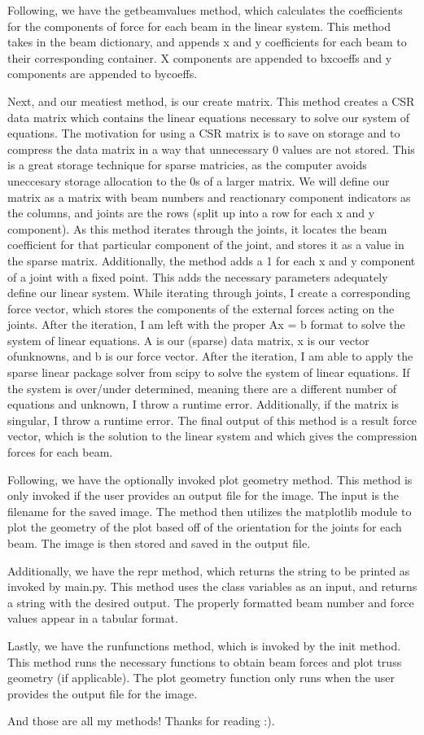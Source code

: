 \documentclass{article}
\begin{document}
Following, we have the getbeamvalues method, which calculates the coefficients
for the components of force for each beam in the linear system. This method 
takes in the beam dictionary, and appends x and y coefficients for each 
beam to their corresponding container. X components are appended to 
bxcoeffs and y components are appended to bycoeffs.

Next, and our meatiest method, is our create matrix. This method creates
a CSR data matrix which contains the linear equations necessary 
to solve our system of equations. The motivation for using a CSR matrix
is to save on storage and to compress the data matrix in a way that 
unnecessary 0 values are not stored. This is a great storage technique 
for sparse matricies, as the computer avoids uneccesary storage 
allocation to the 0s of a larger matrix. We will define our matrix 
as a matrix with beam numbers and reactionary component indicators 
as the columns, and joints are the rows (split up into a row 
for each x and y component). As this method iterates 
through the joints, it locates the beam coefficient for that particular 
component of the joint, and stores it as a value in the sparse matrix.
Additionally, the method adds a 1 for each x and y component of a joint
with a fixed point. This adds the necessary parameters adequately define 
our linear system. While iterating through joints, I create a corresponding 
force vector, which stores the components of the external forces acting 
on the joints. After the iteration, I am left with the proper Ax = b format
to solve the system of linear equations. A is our (sparse) data matrix, x is 
our vector ofunknowns, and b is our force vector. After the iteration, I am able 
to apply the sparse linear package solver from scipy to solve the system 
of linear equations. If the system is over/under determined, meaning 
there are a different number of equations and unknown, I throw 
a runtime error. Additionally, if the matrix is singular, I throw a runtime
error. The final output of this method is a result force vector, which 
is the solution to the linear system and which gives the compression 
forces for each beam. 

Following, we have the optionally invoked plot geometry method. This 
method is only invoked if the user provides an output file for the image. 
The input is the filename for the saved image. The method then utilizes 
the matplotlib module to plot the geometry of the plot based off of the 
orientation for the joints for each beam. The image is then stored 
and saved in the output file. 

Additionally, we have the repr method, which returns the string to be
printed as invoked by main.py. This method uses the class variables as
an input, and returns a string with the desired output. The properly 
formatted beam number and force values appear in a tabular format. 

Lastly, we have the runfunctions method, which is invoked by the init method.
This method runs the necessary functions to obtain beam forces and plot truss
geometry (if applicable). The plot geometry function only runs when the user 
provides the output file for the image. 

And those are all my methods! Thanks for reading :). 
\end{document}
